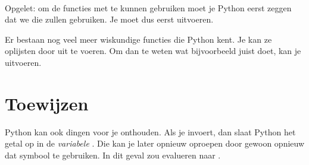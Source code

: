   \\[1em]
  Opgelet: om de functies met  te kunnen gebruiken moet je Python
  eerst zeggen dat we die zullen gebruiken. Je moet dus eerst 
  uitvoeren.

  Er bestaan nog veel meer wiskundige functies die Python kent. Je kan ze
  oplijsten door  uit te voeren. Om dan te weten wat bijvoorbeeld
   juist doet, kan je  uitvoeren.

\section{Toewijzen}
  Python kan ook dingen voor je onthouden. Als je  invoert,
  dan slaat Python het getal  op in de \emph{variabele} .
  Die kan je later opnieuw oproepen door gewoon opnieuw dat symbool te
  gebruiken. In dit geval zou  evalueren naar .

